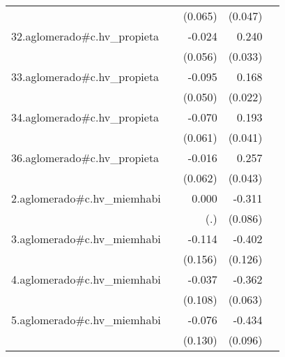 {\begin{longtable}{l*{4}{D{.}{.}{-1}}}
            &                     &     (0.065)         &     (0.047)         &                     \\
\addlinespace
32.aglomerado#c.hv\_propieta&                     &      -0.024         &       0.240\sym{***}&                     \\
            &                     &     (0.056)         &     (0.033)         &                     \\
\addlinespace
33.aglomerado#c.hv\_propieta&                     &      -0.095         &       0.168\sym{***}&                     \\
            &                     &     (0.050)         &     (0.022)         &                     \\
\addlinespace
34.aglomerado#c.hv\_propieta&                     &      -0.070         &       0.193\sym{***}&                     \\
            &                     &     (0.061)         &     (0.041)         &                     \\
\addlinespace
36.aglomerado#c.hv\_propieta&                     &      -0.016         &       0.257\sym{***}&                     \\
            &                     &     (0.062)         &     (0.043)         &                     \\
\addlinespace
2.aglomerado#c.hv\_miemhabi&                     &       0.000         &      -0.311\sym{***}&                     \\
            &                     &         (.)         &     (0.086)         &                     \\
\addlinespace
3.aglomerado#c.hv\_miemhabi&                     &      -0.114         &      -0.402\sym{**} &                     \\
            &                     &     (0.156)         &     (0.126)         &                     \\
\addlinespace
4.aglomerado#c.hv\_miemhabi&                     &      -0.037         &      -0.362\sym{***}&                     \\
            &                     &     (0.108)         &     (0.063)         &                     \\
\addlinespace
5.aglomerado#c.hv\_miemhabi&                     &      -0.076         &      -0.434\sym{***}&                     \\
            &                     &     (0.130)         &     (0.096)         &                     \\

\end{longtable}}
